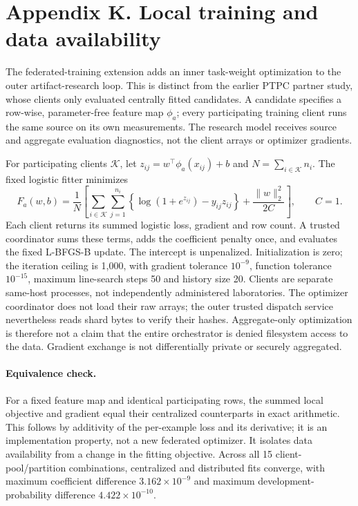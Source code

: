 \section*{Appendix K. Local training and data availability}
\label{app:local-training}
The federated-training extension adds an inner task-weight optimization to the outer artifact-research loop. This is distinct from the earlier PTPC partner study, whose clients only evaluated centrally fitted candidates. A candidate specifies a row-wise, parameter-free feature map $\phi_a$; every participating training client runs the same source on its own measurements. The research model receives source and aggregate evaluation diagnostics, not the client arrays or optimizer gradients.

For participating clients $\mathcal K$, let $z_{ij}=w^\top\phi_a(x_{ij})+b$ and $N=\sum_{i\in\mathcal K}n_i$. The fixed logistic fitter minimizes
\[
 F_a(w,b)=\frac{1}{N}\left[\sum_{i\in\mathcal K}\sum_{j=1}^{n_i}
 \left\{\log(1+e^{z_{ij}})-y_{ij}z_{ij}\right\}
 +\frac{\|w\|_2^2}{2C}\right],\qquad C=1.
\]
Each client returns its summed logistic loss, gradient and row count. A trusted coordinator sums these terms, adds the coefficient penalty once, and evaluates the fixed L-BFGS-B update. The intercept is unpenalized. Initialization is zero; the iteration ceiling is 1,000, with gradient tolerance $10^{-9}$, function tolerance $10^{-15}$, maximum line-search steps 50 and history size 20. Clients are separate same-host processes, not independently administered laboratories. The optimizer coordinator does not load their raw arrays; the outer trusted dispatch service nevertheless reads shard bytes to verify their hashes. Aggregate-only optimization is therefore not a claim that the entire orchestrator is denied filesystem access to the data. Gradient exchange is not differentially private or securely aggregated.

\paragraph{Equivalence check.}
For a fixed feature map and identical participating rows, the summed local objective and gradient equal their centralized counterparts in exact arithmetic. This follows by additivity of the per-example loss and its derivative; it is an implementation property, not a new federated optimizer. It isolates data availability from a change in the fitting objective. Across all 15 client-pool/partition combinations, centralized and distributed fits converge, with maximum coefficient difference $3.162\times10^{-9}$ and maximum development-probability difference $4.422\times10^{-10}$.

